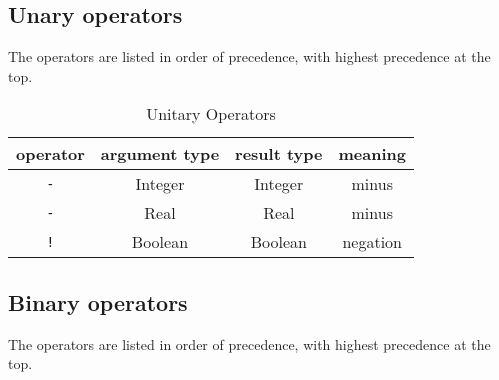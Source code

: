 \subsection{Unary operators}
\label{sec:builtin-unary-ops}

The operators are listed in order of precedence, with highest precedence at the
top.

\begin{table}[H]
\centering
\caption{Unitary Operators}
\begin{tabular}{ c c c c }
\toprule
operator & argument type & result type & meaning \\
\midrule
\verb|-| & Integer & Integer & minus \\
\verb|-| & Real & Real & minus \\
\verb|!| & Boolean & Boolean & negation \\
\bottomrule
\end{tabular}
\end{table}



\subsection{Binary operators}
\label{sec:builtin-binary-ops}

The operators are listed in order of precedence, with highest precedence at the
top.

